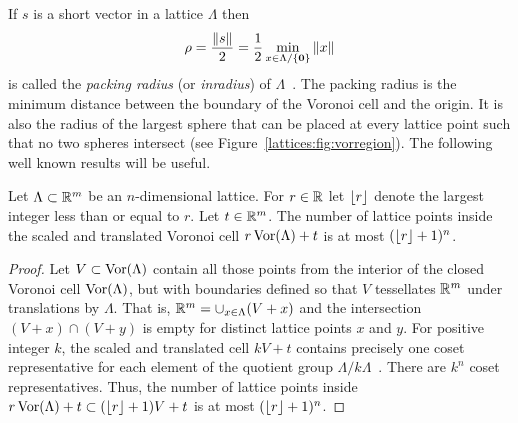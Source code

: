 \documentclass[final,leqno]{siamltex}
\begin{document}
If $s$ is a short vector in a lattice $\Lambda$ then 
\[
\rho = \frac{\|s\|}{2} = \frac{1}{2} \min_{x \in \Lambda / \{\boldsymbol{0}\} } \|x\|
\]
is called the \emph{packing radius} (or \emph{inradius}) of $\Lambda$~\cite{SPLAG}.  The packing radius is the minimum distance between the boundary of the Voronoi cell and the origin.  It is also the radius of the largest sphere that can be placed at every lattice point such that no two spheres intersect (see Figure~\ref{lattices:fig:vorregion}).  The following well known results will be useful.


\begin{proposition}\label{eq:latticepointsinvorcvell}
Let $\Lambda \subset {\mathbb R}^{m}$ be an $n$-dimensional lattice.  For $r\in {\mathbb R}$ let ${\left\lfloor r \right\rfloor}$ denote the largest integer less than or equal to $r$.  Let $t \in {\mathbb R}^m$.  The number of lattice points inside the scaled and translated Voronoi cell $r \operatorname{Vor}(\Lambda) + t$ is at most $({\left\lfloor r \right\rfloor}+1)^n$.
\end{proposition}
\begin{proof}
Let $V \subset \operatorname{Vor}(\Lambda)$ contain all those points from the interior of the closed Voronoi cell $\operatorname{Vor}(\Lambda)$, but with boundaries defined so that $V$ tessellates ${\mathbb R}^m$ under translations by $\Lambda$.  That is, ${\mathbb R}^{m} = \cup_{x \in \Lambda}(V + x)$ and the intersection $(V + x)\cap(V+y)$ is empty for distinct lattice points $x$ and $y$.  For positive integer $k$, the scaled and translated cell $kV + t$ contains precisely one coset representative for each element of the quotient group $\Lambda/k\Lambda$~\cite[Sec.~2.4]{McKilliam2010thesis}.  There are $k^n$ coset representatives.  Thus, the number of lattice points inside $r \operatorname{Vor}(\Lambda) + t \subset ({\left\lfloor r \right\rfloor}+1)V + t$ is at most $({\left\lfloor r \right\rfloor}+1)^n$.
\end{proof}
 
\end{document}
